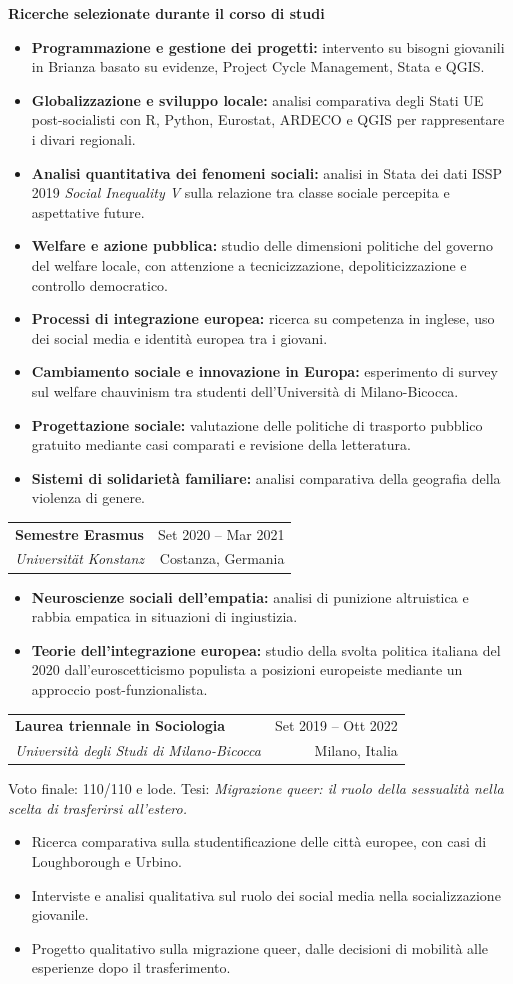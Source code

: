 \documentclass[11pt,a4paper]{article}
\makeatletter
\newcommand{\cventry}[4]{%
  \begin{tabularx}{\textwidth}{@{}Xr@{}}
    {\textbf{#1}} & {#4}\\
    {\emph{#2}} & {#3}
  \end{tabularx}\vspace{0.2em}
}
\makeatother
\begin{document}
\textbf{Ricerche selezionate durante il corso di studi}
\begin{itemize}
  \item \textbf{Programmazione e gestione dei progetti:} intervento su bisogni giovanili in Brianza basato su evidenze, Project Cycle Management, Stata e QGIS.
  \item \textbf{Globalizzazione e sviluppo locale:} analisi comparativa degli Stati UE post-socialisti con R, Python, Eurostat, ARDECO e QGIS per rappresentare i divari regionali.
  \item \textbf{Analisi quantitativa dei fenomeni sociali:} analisi in Stata dei dati ISSP 2019 \emph{Social Inequality V} sulla relazione tra classe sociale percepita e aspettative future.
  \item \textbf{Welfare e azione pubblica:} studio delle dimensioni politiche del governo del welfare locale, con attenzione a tecnicizzazione, depoliticizzazione e controllo democratico.
  \item \textbf{Processi di integrazione europea:} ricerca su competenza in inglese, uso dei social media e identità europea tra i giovani.
  \item \textbf{Cambiamento sociale e innovazione in Europa:} esperimento di survey sul welfare chauvinism tra studenti dell'Università di Milano-Bicocca.
  \item \textbf{Progettazione sociale:} valutazione delle politiche di trasporto pubblico gratuito mediante casi comparati e revisione della letteratura.
  \item \textbf{Sistemi di solidarietà familiare:} analisi comparativa della geografia della violenza di genere.
\end{itemize}

\cventry{Semestre Erasmus}{Universität Konstanz}{Costanza, Germania}{Set 2020 -- Mar 2021}
\begin{itemize}
  \item \textbf{Neuroscienze sociali dell'empatia:} analisi di punizione altruistica e rabbia empatica in situazioni di ingiustizia.
  \item \textbf{Teorie dell'integrazione europea:} studio della svolta politica italiana del 2020 dall'euroscetticismo populista a posizioni europeiste mediante un approccio post-funzionalista.
\end{itemize}

\cventry{Laurea triennale in Sociologia}{Università degli Studi di Milano-Bicocca}{Milano, Italia}{Set 2019 -- Ott 2022}
Voto finale: 110/110 e lode. Tesi: \emph{Migrazione queer: il ruolo della sessualità nella scelta di trasferirsi all'estero.}
\begin{itemize}
  \item Ricerca comparativa sulla studentificazione delle città europee, con casi di Loughborough e Urbino.
  \item Interviste e analisi qualitativa sul ruolo dei social media nella socializzazione giovanile.
  \item Progetto qualitativo sulla migrazione queer, dalle decisioni di mobilità alle esperienze dopo il trasferimento.
\end{itemize}
\end{document}
